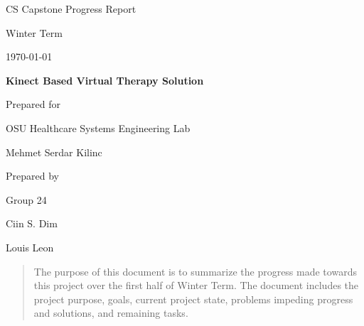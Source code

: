 \documentclass[onecolumn, draftclsnofoot,10pt, compsoc]{IEEEtran}
\def \CapstoneTeamName{     TeamName}
\def \CapstoneTeamNumber{       24}
\def \GroupMemberOne{            Ciin S. Dim}
\def \GroupMemberTwo{           Louis Leon}
\def \CapstoneProjectName{      Kinect Based Virtual Therapy Solution}
\def \CapstoneSponsorCompany{   OSU Healthcare Systems Engineering Lab}
\def \CapstoneSponsorPerson{        Mehmet Serdar Kilinc}
\def \DocType{      %
                Progress Report
                }
\newcommand{\NameSigPair}[1]{\par
\makebox[2.75in][r]{#1} \hfil   \makebox[3.25in]{\makebox[2.25in]{\hrulefill} \hfill        \makebox[.75in]{\hrulefill}}
\par\vspace{-12pt} \textit{\tiny\noindent
\makebox[2.75in]{} \hfil        \makebox[3.25in]{\makebox[2.25in][r]{Signature} \hfill  \makebox[.75in][r]{Date}}}}
\renewcommand{\NameSigPair}[1]{#1}
\begin{document}
\begin{titlepage}
    \begin{singlespace}
        \hfill 
        \par\vspace{.2in}
        \centering
        \scshape{
            \huge CS Capstone\DocType \par
            {\large Winter Term}\par
            {\large\today}\par
            \vspace{.5in}
            \textbf{\Huge\CapstoneProjectName}\par
            \vfill
            {\large Prepared for}\par
            \Huge \CapstoneSponsorCompany\par
            \vspace{5pt}
            {\Large\NameSigPair{\CapstoneSponsorPerson}\par}
            {\large Prepared by }\par
            Group\CapstoneTeamNumber\par
            \vspace{5pt}
            {\Large
                \NameSigPair{\GroupMemberOne}\par
                \NameSigPair{\GroupMemberTwo}\par
            }
            \vspace{20pt}
        }
        \begin{abstract}
        The purpose of this document is to summarize the progress made towards this project over the first half of Winter Term. The document includes the project purpose, goals, current project state, problems impeding progress and solutions, and remaining tasks.
    \end{abstract}     
    \end{singlespace}
\end{titlepage}
\newpage
{}
\tableofcontents
\clearpage
\end{document}

